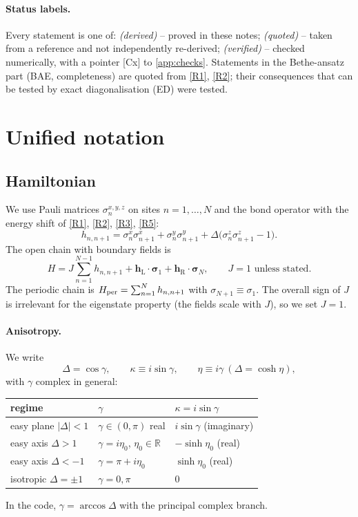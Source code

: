 \documentclass[11pt,a4paper]{article}
\theoremstyle{definition}
\newcommand{\hL}{\mathbf h_{\mathrm L}}
\newcommand{\hR}{\mathbf h_{\mathrm R}}
\newcommand{\bsig}{\boldsymbol\sigma}
\newcommand{\ver}[1]{\textsf{[#1]}}   %
\begin{document}
\paragraph{Status labels.} Every statement is one of: \emph{(derived)} -- proved in these notes; \emph{(quoted)} -- taken from a reference and not independently re-derived; \emph{(verified)} -- checked numerically, with a pointer \ver{Cx} to \cref{app:checks}. Statements in the Bethe-ansatz part (BAE, completeness) are quoted from \ref{R1}, \ref{R2}; their consequences that can be tested by exact diagonalisation (ED) were tested.

\section{Unified notation}\label{sec:notation}

\subsection{Hamiltonian}
We use Pauli matrices $\sigma^{x,y,z}_n$ on sites $n=1,\dots,N$ and the bond operator with the energy shift of \ref{R1}, \ref{R2}, \ref{R3}, \ref{R5}:
\begin{equation}\label{eq:bond}
h_{n,n+1}=\sigma^x_n\sigma^x_{n+1}+\sigma^y_n\sigma^y_{n+1}+\Delta\big(\sigma^z_n\sigma^z_{n+1}-1\big).
\end{equation}
The open chain with boundary fields is
\begin{equation}\label{eq:H}
H=J\sum_{n=1}^{N-1}h_{n,n+1}+\hL\cdot\bsig_1+\hR\cdot\bsig_N ,\qquad J=1 \text{ unless stated.}
\end{equation}
The periodic chain is $H_{\rm per}=\sum_{n=1}^{N}h_{n,n+1}$ with $\sigma_{N+1}\equiv\sigma_1$. The overall sign of $J$ is irrelevant for the eigenstate property (the fields scale with $J$), so we set $J=1$.

\paragraph{Anisotropy.} We write
\begin{equation}\label{eq:gamma}
\Delta=\cos\gamma,\qquad \kappa\equiv i\sin\gamma,\qquad \eta\equiv i\gamma\ (\Delta=\cosh\eta),
\end{equation}
with $\gamma$ complex in general:
\begin{center}
\begin{tabular}{lll}
\toprule
regime & $\gamma$ & $\kappa=i\sin\gamma$\\ \midrule
easy plane $|\Delta|<1$ & $\gamma\in(0,\pi)$ real & $i\sin\gamma$ (imaginary)\\
easy axis $\Delta>1$ & $\gamma=i\eta_0$, $\eta_0\in\mathbb R$ & $-\sinh\eta_0$ (real)\\
easy axis $\Delta<-1$ & $\gamma=\pi+i\eta_0$ & $\sinh\eta_0$ (real)\\
isotropic $\Delta=\pm1$ & $\gamma=0,\pi$ & $0$\\ \bottomrule
\end{tabular}
\end{center}
In the code, $\gamma=\arccos\Delta$ with the principal complex branch.
\end{document}
